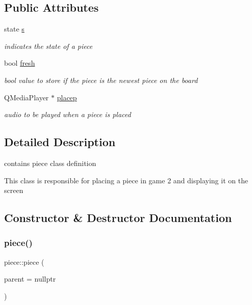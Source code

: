 \subsection*{Public Attributes}
\begin{DoxyCompactItemize}
\item 
\mbox{\label{classpiece_abefadbf9b67a599b3aef7c6fcb731365}} 
state \hyperlink{classpiece_abefadbf9b67a599b3aef7c6fcb731365}{s}
\begin{DoxyCompactList}\small\item\em indicates the state of a piece \end{DoxyCompactList}\item 
\mbox{\label{classpiece_a6bb48a39b35cc414ac7f8e3dc175558f}} 
bool \hyperlink{classpiece_a6bb48a39b35cc414ac7f8e3dc175558f}{fresh}
\begin{DoxyCompactList}\small\item\em bool value to store if the piece is the newest piece on the board \end{DoxyCompactList}\item 
\mbox{\label{classpiece_a070e7829edca743adda436de84161999}} 
Q\+Media\+Player $\ast$ \hyperlink{classpiece_a070e7829edca743adda436de84161999}{placep}
\begin{DoxyCompactList}\small\item\em audio to be played when a piece is placed \end{DoxyCompactList}\end{DoxyCompactItemize}


\subsection{Detailed Description}
contains piece class definition 

This class is responsible for placing a piece in game 2 and displaying it on the screen 

\subsection{Constructor \& Destructor Documentation}
\mbox{\label{classpiece_a65fb95a430bc20242a04556dc1d8bd65}} 
\subsubsection{\texorpdfstring{piece()}{piece()}}
{\footnotesize\ttfamily piece\+::piece (\begin{DoxyParamCaption}\item[{Q\+Object $\ast$}]{parent = {\ttfamily nullptr} }\end{DoxyParamCaption})\hspace{0.3cm}{\ttfamily [explicit]}}



